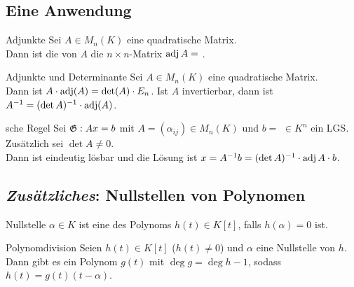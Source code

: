 \subsection{%
    Eine Anwendung%
}

\begin{Def}{Adjunkte}
    Sei $A \in M_n(K)$ eine quadratische Matrix. \\
    Dann ist die  von $A$ die $n \times n$-Matrix
    $\operatorname{adj} A =$ .
\end{Def}

\begin{Satz}{Adjunkte und Determinante}
    Sei $A \in M_n(K)$ eine quadratische Matrix. \\
    Dann ist $A \cdot \operatorname{adj}(A) = \det(A) \cdot E_n$. \qquad
    Ist $A$ invertierbar, dann ist $A^{-1} = (\det A)^{-1} \cdot \operatorname{adj}(A)$.
\end{Satz}

\begin{Satz}{sche Regel}
    Sei $\mathfrak{G}: Ax = b$ mit $A = (\alpha_{ij}) \in M_n(K)$ und
    $b = $  $ \in K^n$ ein LGS.
    Zusätzlich sei $\det A \not= 0$. \\
    Dann ist  eindeutig lösbar und die Lösung ist
    $x = A^{-1} b = (\det A)^{-1} \cdot \operatorname{adj} A \cdot b$.
\end{Satz}

\subsection{%
    \emph{Zusätzliches}: Nullstellen von Polynomen%
}

\begin{Def}{Nullstelle}
    $\alpha \in K$ ist eine  des Polynoms $h(t) \in K[t]$,
    falls $h(\alpha) = 0$ ist.
\end{Def}

\begin{Satz}{Polynomdivision}
    Seien $h(t) \in K[t]$ ($h(t) \not= 0$) und $\alpha$ eine Nullstelle
    von $h$. \\
    Dann gibt es ein Polynom $g(t)$ mit $\deg g = \deg h - 1$, sodass
    $h(t) = g(t) (t - \alpha)$.
\end{Satz}

